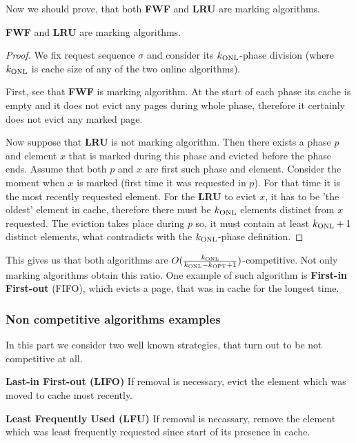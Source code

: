 Now we should prove, that both \textbf{FWF} and \textbf{LRU} are
marking algorithms.
\begin{propo}
 \textbf{FWF} and \textbf{LRU} are marking algorithms.
\end{propo}
\begin{proof}
 We fix request sequence $\sigma$ and consider its $k_{\mathrm{ONL}}$-phase division 
(where $k_{\mathrm{ONL}}$ is cache size of any of the two online algorithms).

First, see that \textbf{FWF} is marking algorithm. At the start of each phase 
its cache is empty and it does not evict any pages during whole phase, 
therefore it certainly does not evict any marked page.

Now suppose that \textbf{LRU} is not marking algorithm. Then there exists a 
phase $p$ and element $x$ that is marked during this phase and evicted before 
the phase ends. Assume that both $p$ and $x$ are first such phase and element. 
Consider the moment when $x$ is marked (first time it was requested in $p$). 
For that time it is the most recently requested element. For the \textbf{LRU} to 
evict $x$, it has to be 'the oldest' element in cache, therefore there must be 
$k_{\mathrm{ONL}}$ elements distinct from $x$ requested. The eviction takes place 
during $p$ so, it must contain 
at least $k_{\mathrm{ONL}}+1$ distinct elements, what contradicts with the $k_{\mathrm{ONL}}$-phase definition. 
\end{proof}
This gives us that both algorithms are $O(\frac{k_{\mathrm{ONL}}}{k_{\mathrm{ONL}}-k_{\mathrm{OPT}}+1})$-competitive. Not 
only marking algorithms obtain this ratio. One example of such algorithm is 
\textbf{First-in First-out} (FIFO), which evicts a page, that was in cache for 
the longest time.

\subsubsection{Non competitive algorithms examples}
In this part we consider two well known strategies, that turn out to be not 
competitive at all.
\begin{myalgo}
 \textbf{Last-in First-out (LIFO)}
 \newline
If removal is necessary, evict the element which was moved to cache most 
recently.
\end{myalgo}
\begin{myalgo}
 \textbf{Least Frequently Used (LFU)}
 \newline
If removal is necassary, remove the element which was least frequently requested since start of its 
presence in cache.
\end{myalgo}

